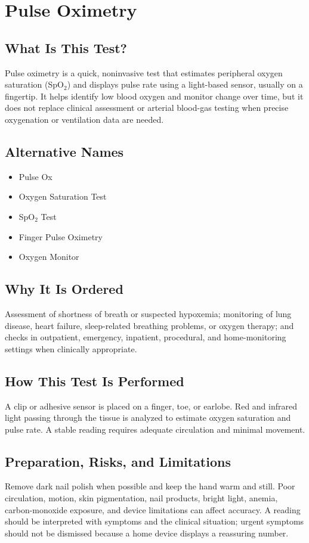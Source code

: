 \chapter{Pulse Oximetry}

\section*{What Is This Test?}
Pulse oximetry is a quick, noninvasive test that estimates peripheral oxygen saturation (SpO$_2$) and displays pulse rate using a light-based sensor, usually on a fingertip. It helps identify low blood oxygen and monitor change over time, but it does not replace clinical assessment or arterial blood-gas testing when precise oxygenation or ventilation data are needed.

\section*{Alternative Names}
\begin{itemize}
  \item Pulse Ox
  \item Oxygen Saturation Test
  \item SpO$_2$ Test
  \item Finger Pulse Oximetry
  \item Oxygen Monitor
\end{itemize}
\section*{Why It Is Ordered}
Assessment of shortness of breath or suspected hypoxemia; monitoring of lung disease, heart failure, sleep-related breathing problems, or oxygen therapy; and checks in outpatient, emergency, inpatient, procedural, and home-monitoring settings when clinically appropriate.

\section*{How This Test Is Performed}
A clip or adhesive sensor is placed on a finger, toe, or earlobe. Red and infrared light passing through the tissue is analyzed to estimate oxygen saturation and pulse rate. A stable reading requires adequate circulation and minimal movement.

\section*{Preparation, Risks, and Limitations}
Remove dark nail polish when possible and keep the hand warm and still. Poor circulation, motion, skin pigmentation, nail products, bright light, anemia, carbon-monoxide exposure, and device limitations can affect accuracy. A reading should be interpreted with symptoms and the clinical situation; urgent symptoms should not be dismissed because a home device displays a reassuring number.

